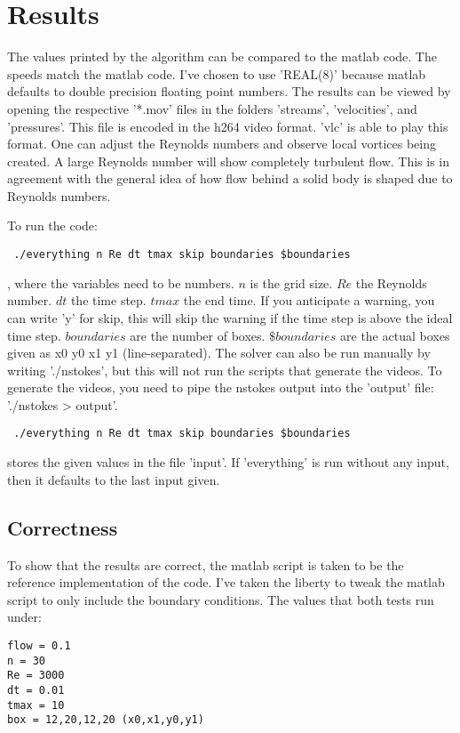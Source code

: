 \documentclass[listof=totoc]{report}
\begin{document}
\section{Results}
The values printed by the algorithm can be compared to the matlab code. The speeds match the matlab code. I've chosen to use 'REAL(8)' because matlab defaults to double precision floating point numbers. The results can be viewed by opening the respective '*.mov' files in the folders 'streams', 'velocities', and 'pressures'. This file is encoded in the h264 video format. 'vlc' is able to play this format. One can adjust the Reynolds numbers and observe local vortices being created. A large Reynolds number will show completely turbulent flow. This is in agreement with the general idea of how flow behind a solid body is shaped due to Reynolds numbers.

To run the code:
\begin{verbatim} ./everything n Re dt tmax skip boundaries $boundaries \end{verbatim}, where the variables need to be numbers. $n$ is the grid size. $Re$ the Reynolds number. $dt$ the time step. $tmax$ the end time. If you anticipate a warning, you can write 'y' for skip, this will skip the warning if the time step is above the ideal time step. $boundaries$ are the number of boxes. $\$boundaries$ are the actual boxes given as x0 y0 x1 y1 (line-separated). The solver can also be run manually by writing './nstokes', but this will not run the scripts that generate the videos. To generate the videos, you need to pipe the nstokes output into the 'output' file: './nstokes > output'.
\begin{verbatim} ./everything n Re dt tmax skip boundaries $boundaries \end{verbatim} stores the given values in the file 'input'. If 'everything' is run without any input, then it defaults to the last input given.

\subsection{Correctness}
To show that the results are correct, the matlab script is taken to be the reference implementation of the code. I've taken the liberty to tweak the matlab script to only include the boundary conditions. The values that both tests run under:

\begin{verbatim}
flow = 0.1
n = 30
Re = 3000
dt = 0.01
tmax = 10
box = 12,20,12,20 (x0,x1,y0,y1)
\end{verbatim}
\end{document}
